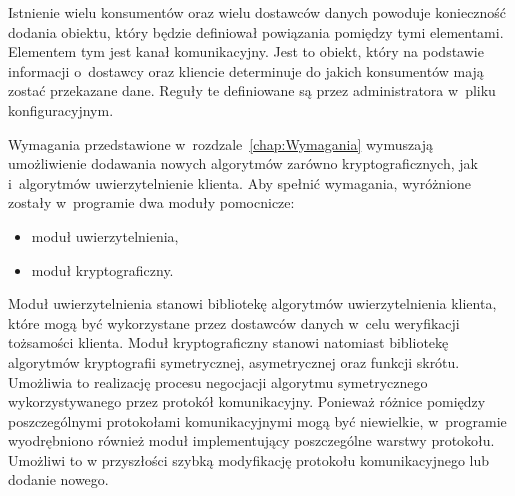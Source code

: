 Istnienie wielu konsumentów oraz wielu dostawców danych powoduje
konieczność dodania obiektu, który będzie definiował powiązania
pomiędzy tymi elementami. Elementem tym jest kanał komunikacyjny. Jest
to obiekt, który na podstawie informacji o~dostawcy oraz kliencie
determinuje do jakich konsumentów mają zostać przekazane dane. Reguły
te definiowane są przez administratora w~pliku konfiguracyjnym.

Wymagania przedstawione w~rozdzale~\ref{chap:Wymagania} wymuszają
umożliwienie dodawania nowych algorytmów zarówno kryptograficznych,
jak i~algorytmów uwierzytelnienie klienta. Aby spełnić wymagania,
wyróżnione zostały w~programie dwa moduły pomocnicze:

\begin{itemize}
\item moduł uwierzytelnienia,
\item moduł kryptograficzny.
\end{itemize}

Moduł uwierzytelnienia stanowi bibliotekę algorytmów uwierzytelnienia
klienta, które mogą być wykorzystane przez dostawców danych w~celu
weryfikacji tożsamości klienta. Moduł kryptograficzny stanowi
natomiast bibliotekę algorytmów kryptografii symetrycznej,
asymetrycznej oraz funkcji skrótu. Umożliwia to realizację procesu
negocjacji algorytmu symetrycznego wykorzystywanego przez protokół
komunikacyjny. Ponieważ różnice pomiędzy poszczególnymi protokołami
komunikacyjnymi mogą być niewielkie, w~programie wyodrębniono również
moduł implementujący poszczególne warstwy protokołu. Umożliwi to w
przyszłości szybką modyfikację protokołu komunikacyjnego lub dodanie
nowego.

